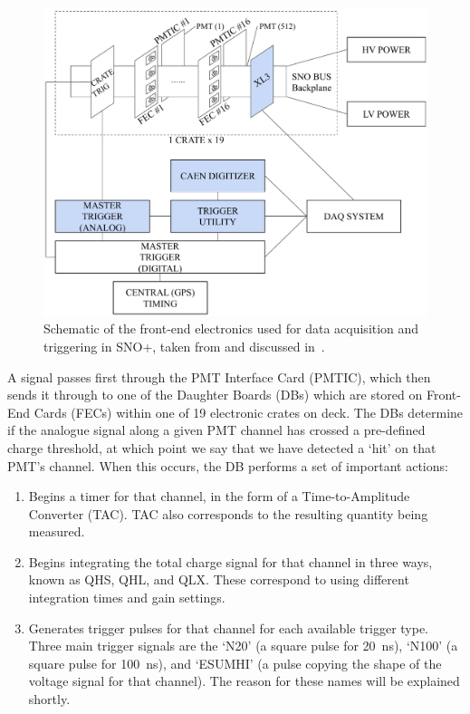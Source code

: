 \begin{figure}
    \centering
    \includegraphics[width=0.8\linewidth]{2_Detector/Figs/electronics_diagram.pdf}
    \caption[]{Schematic of the front-end electronics used for data acquisition and triggering in SNO+, taken from and discussed in~\cite{}. %
    }
    \label{fig:tdaq_schematic}
\end{figure}

A signal passes first through the PMT Interface Card (PMTIC), which then sends it through to one of the Daughter Boards (DBs) which are stored on Front-End Cards (FECs) within one of 19 electronic crates on deck. The DBs determine if the analogue signal along a given PMT channel has crossed a pre-defined charge threshold, at which point we say that we have detected a `hit' on that PMT's channel. When this occurs, the DB performs a set of important actions:
\begin{enumerate}
    \item Begins a timer for that channel, in the form of a Time-to-Amplitude Converter (TAC). TAC also corresponds to the resulting quantity being measured.
    \item Begins integrating the total charge signal for that channel in three ways, known as QHS, QHL, and QLX. These correspond to using different integration times and gain settings.
    \item Generates trigger pulses for that channel for each available trigger type. Three main trigger signals are the `N20' (a square pulse for \SI{20}{\ns}), `N100' (a square pulse for \SI{100}{\ns}), and `ESUMHI' (a pulse copying the shape of the voltage signal for that channel). The reason for these names will be explained shortly.
\end{enumerate}

